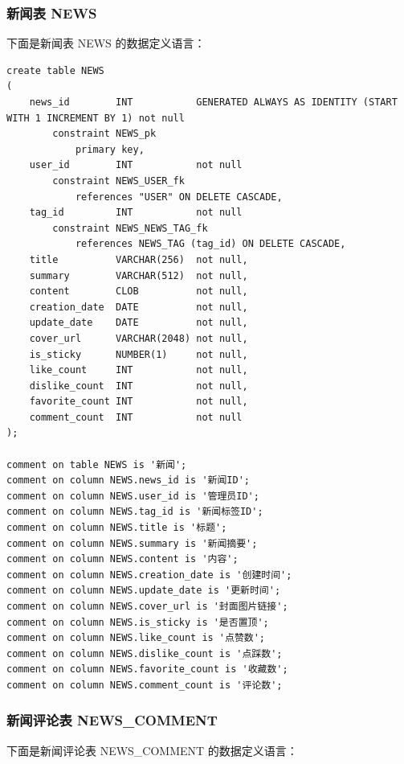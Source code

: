 \subsubsection{新闻表 NEWS}

下面是新闻表 NEWS 的数据定义语言：

\begin{verbatim}
create table NEWS
(
    news_id        INT           GENERATED ALWAYS AS IDENTITY (START WITH 1 INCREMENT BY 1) not null
        constraint NEWS_pk
            primary key,
    user_id        INT           not null
        constraint NEWS_USER_fk
            references "USER" ON DELETE CASCADE,
    tag_id         INT           not null
        constraint NEWS_NEWS_TAG_fk
            references NEWS_TAG (tag_id) ON DELETE CASCADE,
    title          VARCHAR(256)  not null,
    summary        VARCHAR(512)  not null,
    content        CLOB          not null,
    creation_date  DATE          not null,
    update_date    DATE          not null,
    cover_url      VARCHAR(2048) not null,
    is_sticky      NUMBER(1)     not null,
    like_count     INT           not null,
    dislike_count  INT           not null,
    favorite_count INT           not null,
    comment_count  INT           not null
);

comment on table NEWS is '新闻';
comment on column NEWS.news_id is '新闻ID';
comment on column NEWS.user_id is '管理员ID';
comment on column NEWS.tag_id is '新闻标签ID';
comment on column NEWS.title is '标题';
comment on column NEWS.summary is '新闻摘要';
comment on column NEWS.content is '内容';
comment on column NEWS.creation_date is '创建时间';
comment on column NEWS.update_date is '更新时间';
comment on column NEWS.cover_url is '封面图片链接';
comment on column NEWS.is_sticky is '是否置顶';
comment on column NEWS.like_count is '点赞数';
comment on column NEWS.dislike_count is '点踩数';
comment on column NEWS.favorite_count is '收藏数';
comment on column NEWS.comment_count is '评论数';
\end{verbatim}

\subsubsection{新闻评论表 NEWS\_COMMENT}

下面是新闻评论表 NEWS\_COMMENT 的数据定义语言：


